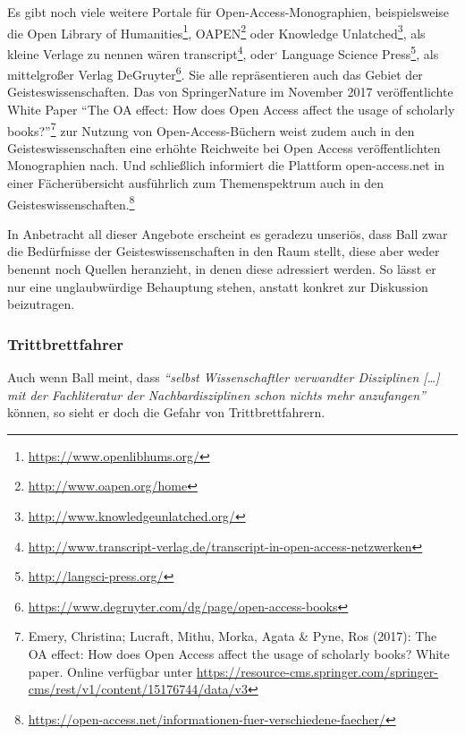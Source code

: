 \documentclass[a4paper,
fontsize=11pt,
oneside,
numbers=noperiodatend,
parskip=half-,
bibliography=totoc,
final
]{scrartcl}
\begin{document}
Es gibt noch viele weitere Portale für Open-Access-Monographien,
beispielsweise die Open Library of Humanities\footnote{\url{https://www.openlibhums.org/}},
OAPEN\footnote{\url{http://www.oapen.org/home}} oder Knowledge
Unlatched\footnote{\url{http://www.knowledgeunlatched.org/}}, als kleine
Verlage zu nennen wären transcript\footnote{\url{http://www.transcript-verlag.de/transcript-in-open-access-netzwerken}},
oder\textsuperscript{,} Language Science Press\footnote{\url{http://langsci-press.org/}},
als mittelgroßer Verlag DeGruyter\footnote{\url{https://www.degruyter.com/dg/page/open-access-books}}.
Sie alle repräsentieren auch das Gebiet der Geisteswissenschaften. Das
von SpringerNature im November 2017 veröffentlichte White Paper
\enquote{The OA effect: How does Open Access affect the usage of
scholarly books?}\footnote{Emery, Christina; Lucraft, Mithu, Morka,
  Agata \& Pyne, Ros (2017): The OA effect: How does Open Access affect
  the usage of scholarly books? White paper. Online verfügbar unter
  \url{https://resource-cms.springer.com/springer-cms/rest/v1/content/15176744/data/v3}}
zur Nutzung von Open-Access-Büchern weist zudem auch in den
Geisteswissenschaften eine erhöhte Reichweite bei Open Access
veröffentlichten Monographien nach. Und schließlich informiert die
Plattform open-access.net in einer Fächerübersicht ausführlich zum
Themenspektrum auch in den Geisteswissenschaften.\footnote{\url{https://open-access.net/informationen-fuer-verschiedene-faecher/}}

In Anbetracht all dieser Angebote erscheint es geradezu unseriös, dass
Ball zwar die Bedürfnisse der Geisteswissenschaften in den Raum stellt,
diese aber weder benennt noch Quellen heranzieht, in denen diese
adressiert werden. So lässt er nur eine unglaubwürdige Behauptung
stehen, anstatt konkret zur Diskussion beizutragen.

\hypertarget{trittbrettfahrer}{%
\subsubsection{Trittbrettfahrer}\label{trittbrettfahrer}}

Auch wenn Ball meint, dass \emph{\enquote{selbst Wissenschaftler
verwandter Disziplinen {[}\ldots{}{]} mit der Fachliteratur der
Nachbardisziplinen schon nichts mehr anzufangen}} können, so sieht er
doch die Gefahr von Trittbrettfahrern.
\end{document}
